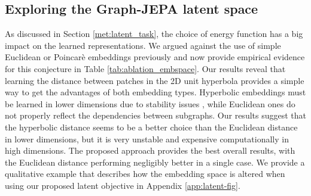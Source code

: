 \documentclass{article} \usepackage{iclr2024_conference,times}
\begin{document}
\subsection{Exploring the Graph-JEPA latent space} \label{par:latent_space_ablations}
As discussed in Section \ref{met:latent_task}, the choice of energy function has a big impact on the learned representations. We argued against the use of simple Euclidean or Poincarè embeddings previously and now provide empirical evidence for this conjecture in Table \ref{tab:ablation_embspace}. Our results reveal that learning the distance between patches in the 2D unit hyperbola provides a simple way to get the advantages of both embedding types. Hyperbolic embeddings must be learned in lower dimensions due to stability issues \citep{tao2021hyperFloatErrors}, while Euclidean ones do not properly reflect the dependencies between subgraphs. Our results suggest that the hyperbolic distance seems to be a better choice than the Euclidean distance in lower dimensions, but it is very unstable and expensive computationally in high dimensions. The proposed approach provides the best overall results, with the Euclidean distance performing negligibly better in a single case. We provide a qualitative example that describes how the embedding space is altered when using our proposed latent objective in Appendix \ref{app:latent-fig}.
\begin{table}
    \centering
    \caption{Comparison of Graph-JEPA performance for different distance functions. We used a latent space of dimension 128 for Poincarè embeddings due to optimization issues, which was still problematic for the IMDB-B dataset. LD stands for Lower Dimension, where we use a much smaller embedding size (32).}
    \label{tab:ablation_embspace}
\end{table}
\end{document}
